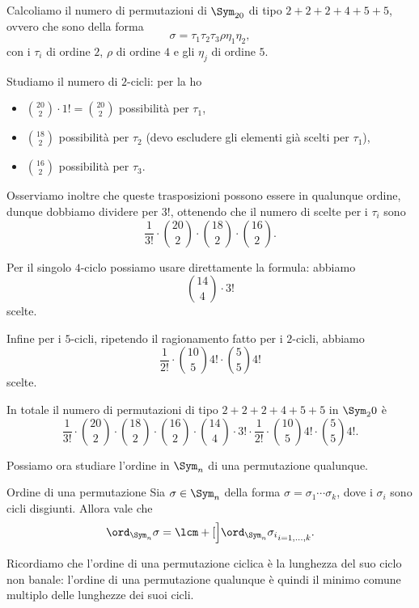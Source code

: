 \begin{example}
    Calcoliamo il numero di permutazioni di $\Sym_{20}$ di tipo $2 + 2 + 2 + 4 + 5 + 5$, ovvero che sono della forma \[
        \sigma = \tau_1\tau_2\tau_3 \rho \eta_1 \eta_2,
    \] con i $\tau_i$ di ordine $2$, $\rho$ di ordine $4$ e gli $\eta_j$ di ordine $5$.
    
    Studiamo il numero di $2$-cicli: per la  ho 
    \begin{itemize}
        \item $\binom{20}{2} \cdot 1! = \binom{20}{2}$ possibilità per $\tau_1$,  
        \item $\binom{18}{2}$ possibilità per $\tau_2$ (devo escludere gli elementi già scelti per $\tau_1$),
        \item $\binom{16}{2}$ possibilità per $\tau_3$.
    \end{itemize}
    Osserviamo inoltre che queste trasposizioni possono essere in qualunque ordine, dunque dobbiamo dividere per $3!$, ottenendo che il numero di scelte per i $\tau_i$ sono \[
        \frac{1}{3!} \cdot \binom{20}{2} \cdot \binom{18}{2} \cdot \binom{16}{2}.
    \] 

    Per il singolo $4$-ciclo possiamo usare direttamente la formula: abbiamo \[
        \binom{14}{4} \cdot 3!
    \] scelte.

    Infine per i $5$-cicli, ripetendo il ragionamento fatto per i $2$-cicli, abbiamo \[
        \frac{1}{2!} \cdot \binom{10}{5}4! \cdot \binom{5}{5}4!
    \] scelte.

    In totale il numero di permutazioni di tipo $2 + 2 + 2 + 4 + 5 + 5$ in $\Sym_20$ è \[
        \frac{1}{3!} \cdot \binom{20}{2} \cdot \binom{18}{2} \cdot \binom{16}{2} 
        \cdot \binom{14}{4} \cdot 3! 
        \cdot \frac{1}{2!} \cdot \binom{10}{5}4! \cdot \binom{5}{5}4!.
    \]
\end{example}

Possiamo ora studiare l'ordine in $\Sym_n$ di una permutazione qualunque.

\begin{proposition}
    {Ordine di una permutazione}{}
    Sia $\sigma \in \Sym_n$ della forma $\sigma = \sigma_1 \cdots \sigma_k$, dove i $\sigma_i$ sono cicli disgiunti. Allora vale che \[
        \ord_{\Sym_n}{\sigma} = \lcm+[\Big]{\ord_{\Sym_n}{\sigma_i}}_{i=1, \dots, k}.
    \] 
\end{proposition}

\begin{remark}
    Ricordiamo che l'ordine di una permutazione ciclica è la lunghezza del suo ciclo non banale: l'ordine di una permutazione qualunque è quindi il minimo comune multiplo delle lunghezze dei suoi cicli.
\end{remark}

